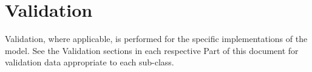 %
%
% 
%

\section{Validation}


Validation, where applicable, is performed for the specific implementations of the model.  See the Validation sections in each respective Part of this document for validation data appropriate to each sub-class.
